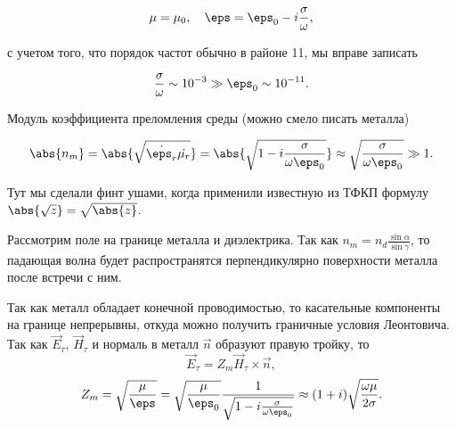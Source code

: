 $$\mu=\mu_0, \quad \eps=\eps_0-i\frac{\sigma}{\omega}, $$

с учетом того, что порядок частот обычно в районе 11, мы вправе записать

$$\frac{\sigma}{\omega} \sim 10^{-3} \gg \eps_0 \sim 10^{-11}. $$

Модуль коэффициента преломления среды (можно смело писать металла)

$$\abs{n_{m}}=\abs{\sqrt{\dot{\eps_r}\dot{\mu_r}}}=\abs{\sqrt{1-i\frac{\sigma}{\omega\eps_0}}} \approx
\sqrt{\frac{\sigma}{\omega\eps_0}} \gg 1.$$

Тут мы сделали финт ушами, когда применили известную из ТФКП формулу $\abs{\sqrt{z}}=\sqrt{\abs{z}}$.

Рассмотрим поле на границе металла и диэлектрика. Так как $n_{m}=n_{d}\frac{\sin\alpha}{\sin\gamma}$, то падающая волна будет распространятся перпендикулярно
поверхности металла после встречи с ним.

Так как металл обладает конечной проводимостью, то касательные компоненты на границе непрерывны, откуда можно получить граничные условия Леонтовича. Так как \( \vec{E}_\tau \), \( \vec{H}_\tau \) и нормаль в металл \( \vec{n} \) образуют правую тройку, то
\[
    \vec{E}_\tau = Z_{m}\vec{H}_\tau\times\vec{n},
\]
\[
    Z_m = \sqrt{\frac{\mu}{\eps}} = \sqrt{\frac{\mu}{\eps_0}}\frac{1}{\sqrt{1 -i\frac{\sigma}{\omega\eps_0}}} \approx (1+i)\sqrt\frac{\omega\mu}{2\sigma}.
\]

